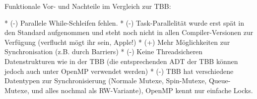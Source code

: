 \documentclass[11pt]{scrartcl}
\begin{document}
Funktionale Vor- und Nachteile im Vergleich zur TBB:

  * (-) Parallele While-Schleifen fehlen.
  * (-) Task-Parallelität wurde erst spät in den Standard aufgenommen und steht noch nicht in allen Compiler-Versionen zur Verfügung (verflucht mögt ihr sein, Apple!)
  * (+) Mehr Möglichkeiten zur Synchronisation (z.B. durch Barriers)
  * (-) Keine Threadsicheren Datenstrukturen wie in der TBB (die entsprechenden ADT der TBB können jedoch auch unter OpenMP verwendet werden)
  * (-) TBB hat verschiedene Datentypen zur Synchronisierung (Normale Mutexe, Spin-Mutexe, Queue-Mutexe, und alles nochmal als RW-Variante), OpenMP kennt nur einfache Locks.

\cite{openmptut}

\pagebreak %

\thispagestyle{empty}
\listoffigures

\listoftables

\lstlistoflistings



	
\end{document}
